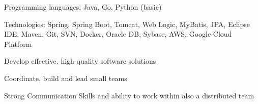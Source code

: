 

\begin{cvitems}
  \item {Programming languages: Java, Go, Python (basic)}
  \item {Technologies: Spring, Spring Boot, Tomcat, Web Logic, MyBatis, JPA, Eclipse IDE, Maven, Git, SVN, Docker, Oracle DB, Sybase, AWS, Google Cloud Platform}
  \item {Develop effective, high-quality software solutions}
  \item {Coordinate, build and lead small teams}
  \item {Strong Communication Skills and ability to work within also a distributed team}
\end{cvitems}
